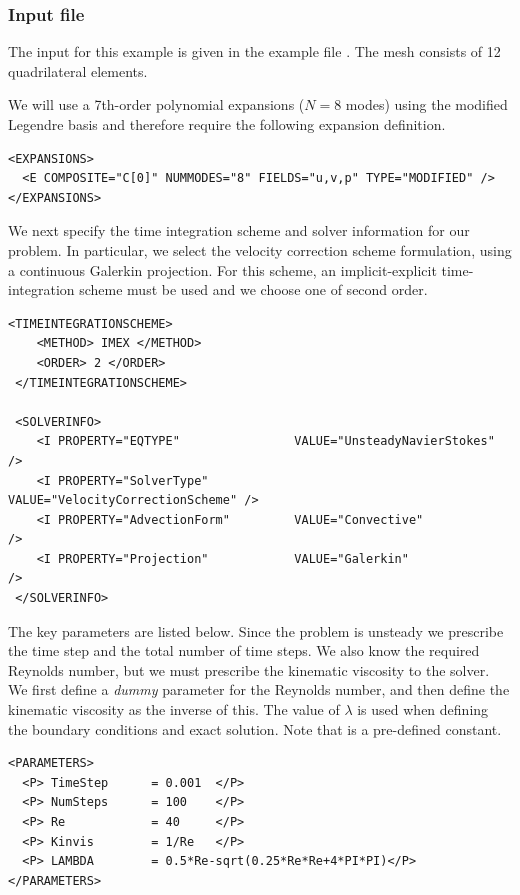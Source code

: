 \subsubsection{Input file}
The input for this example is given in the example file
. The mesh consists of 12 quadrilateral elements.

We will use a 7th-order polynomial expansions ($N=8$ modes) using the
modified Legendre basis and therefore require the following expansion
definition.
\begin{lstlisting}[style=XMLStyle]
<EXPANSIONS>
  <E COMPOSITE="C[0]" NUMMODES="8" FIELDS="u,v,p" TYPE="MODIFIED" />
</EXPANSIONS>
\end{lstlisting}

We next specify the time integration scheme and solver information for
our problem. In particular, we select the velocity correction scheme
formulation, using a continuous Galerkin projection. For this scheme,
an implicit-explicit time-integration scheme must be used and we choose
one of second order.
\begin{lstlisting}[style=XMLStyle]
 <TIMEINTEGRATIONSCHEME>
    <METHOD> IMEX </METHOD>
    <ORDER> 2 </ORDER>
 </TIMEINTEGRATIONSCHEME>

 <SOLVERINFO>
    <I PROPERTY="EQTYPE"                VALUE="UnsteadyNavierStokes"     />
    <I PROPERTY="SolverType"            VALUE="VelocityCorrectionScheme" />
    <I PROPERTY="AdvectionForm"         VALUE="Convective"               />
    <I PROPERTY="Projection"            VALUE="Galerkin"                 />
 </SOLVERINFO>
\end{lstlisting}

The key parameters are listed below. Since the problem is unsteady we prescribe
the time step and the total number of time steps. We also know the required
Reynolds number, but we must prescribe the kinematic viscosity to the solver. We
first define a \emph{dummy} parameter for the Reynolds number, and then define
the kinematic viscosity as the inverse of this. The value of $\lambda$ is used
when defining the boundary conditions and exact solution. Note that 
is a pre-defined constant.

\begin{lstlisting}[style=XMLStyle]
<PARAMETERS>
  <P> TimeStep      = 0.001  </P>
  <P> NumSteps      = 100    </P>
  <P> Re            = 40     </P>
  <P> Kinvis        = 1/Re   </P>
  <P> LAMBDA        = 0.5*Re-sqrt(0.25*Re*Re+4*PI*PI)</P>
</PARAMETERS>
\end{lstlisting}

